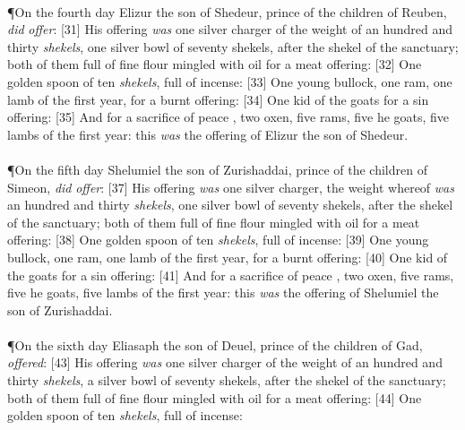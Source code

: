 \\
\P \textcolor[cmyk]{0.99998,1,0,0}{On the fourth day Elizur the son of Shedeur, prince of the children of Reuben, \emph{did} \emph{offer}:}
[31] \textcolor[cmyk]{0.99998,1,0,0}{His offering \emph{was} one silver charger of the weight of an hundred and thirty \emph{shekels}, one silver bowl of seventy shekels, after the shekel of the sanctuary; both of them full of fine flour mingled with oil for a meat offering:}
[32] \textcolor[cmyk]{0.99998,1,0,0}{One golden spoon of ten \emph{shekels}, full of incense:}
[33] \textcolor[cmyk]{0.99998,1,0,0}{One young bullock, one ram, one lamb of the first year, for a burnt offering:}
[34] \textcolor[cmyk]{0.99998,1,0,0}{One kid of the goats for a sin offering:}
[35] \textcolor[cmyk]{0.99998,1,0,0}{And for a sacrifice of peace , two oxen, five rams, five he goats, five lambs of the first year: this \emph{was} the offering of Elizur the son of Shedeur.}\\
\\
\P \textcolor[cmyk]{0.99998,1,0,0}{On the fifth day Shelumiel the son of Zurishaddai, prince of the children of Simeon, \emph{did} \emph{offer}:}
[37] \textcolor[cmyk]{0.99998,1,0,0}{His offering \emph{was} one silver charger, the weight whereof \emph{was} an hundred and thirty \emph{shekels}, one silver bowl of seventy shekels, after the shekel of the sanctuary; both of them full of fine flour mingled with oil for a meat offering:}
[38] \textcolor[cmyk]{0.99998,1,0,0}{One golden spoon of ten \emph{shekels}, full of incense:}
[39] \textcolor[cmyk]{0.99998,1,0,0}{One young bullock, one ram, one lamb of the first year, for a burnt offering:}
[40] \textcolor[cmyk]{0.99998,1,0,0}{One kid of the goats for a sin offering:}
[41] \textcolor[cmyk]{0.99998,1,0,0}{And for a sacrifice of peace , two oxen, five rams, five he goats, five lambs of the first year: this \emph{was} the offering of Shelumiel the son of Zurishaddai.}\\
\\
\P \textcolor[cmyk]{0.99998,1,0,0}{On the sixth day Eliasaph the son of Deuel, prince of the children of Gad, \emph{offered}:}
[43] \textcolor[cmyk]{0.99998,1,0,0}{His offering \emph{was} one silver charger of the weight of an hundred and thirty \emph{shekels}, a silver bowl of seventy shekels, after the shekel of the sanctuary; both of them full of fine flour mingled with oil for a meat offering:}
[44] \textcolor[cmyk]{0.99998,1,0,0}{One golden spoon of ten \emph{shekels}, full of incense:}
